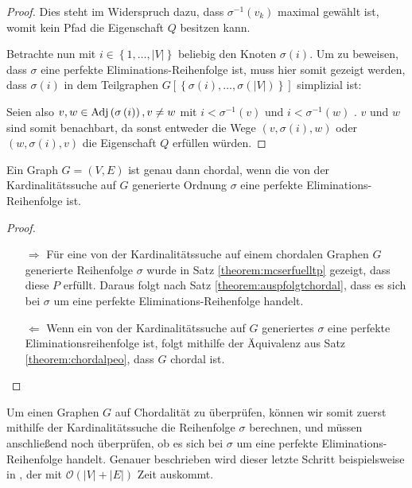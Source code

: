 \begin{proof}
	Dies steht im Widerspruch dazu, dass \( \sigma^{-1} \left( v_k \right) \) maximal gewählt ist, womit kein Pfad die Eigenschaft \( Q \) besitzen kann.

	Betrachte nun mit \( i \in \left\lbrace 1, \dots, \left| V \right| \right\rbrace \) beliebig den Knoten \( \sigma \left( i \right) \). Um zu beweisen, dass \( \sigma \) eine perfekte Eliminations-Reihenfolge ist, muss hier somit gezeigt werden, dass \( \sigma \left( i \right) \) in dem Teilgraphen \( G \left[ \left\lbrace \sigma \left( i \right), \ldots, \sigma \left( \left| V \right| \right) \right\rbrace \right] \) simplizial ist:

	Seien also \( v, w \in \textnormal{Adj} \left( \sigma \left( i \right) \right), v \neq w \) mit \( i < \sigma^{-1} \left( v \right) \) und \( i < \sigma^{-1} \left( w \right) \) . \( v \) und \( w \) sind somit benachbart, da sonst entweder die Wege \( \left( v, \sigma \left( i \right), w \right) \) oder \( \left( w, \sigma \left( i \right), v \right) \) die Eigenschaft \( Q \) erfüllen würden.
\end{proof}

\begin{corollary}
	Ein Graph \( G = \left( V, E \right) \) ist genau dann chordal, wenn die von der Kardinalitätssuche auf \( G \) generierte Ordnung \( \sigma \) eine perfekte Eliminations-Reihenfolge ist.
\end{corollary}

\begin{proof}
	\begin{itemize}
		\item[\( \Rightarrow \)]
		      Für eine von der Kardinalitätssuche auf einem chordalen Graphen \( G \) generierte Reihenfolge \( \sigma \) wurde in Satz \ref{theorem:mcserfuelltp} gezeigt, dass diese \( P \) erfüllt. Daraus folgt nach Satz \ref{theorem:auspfolgtchordal}, dass es sich bei \( \sigma \) um eine perfekte Eliminations-Reihenfolge handelt.
		\item[\( \Leftarrow \)]
		      Wenn ein von der Kardinalitätssuche auf \( G \) generiertes \( \sigma \) eine perfekte Eliminationsreihenfolge ist, folgt mithilfe der Äquivalenz aus Satz \ref{theorem:chordalpeo}, dass \( G \) chordal ist.
	\end{itemize}
\end{proof}

Um einen Graphen \( G \) auf Chordalität zu überprüfen, können wir somit zuerst mithilfe der Kardinalitätssuche die Reihenfolge \( \sigma \) berechnen, und müssen anschließend noch überprüfen, ob es sich bei \( \sigma \) um eine perfekte Eliminations-Reihenfolge handelt. Genauer beschrieben wird dieser letzte Schritt beispielsweise in \cite[Algorithmus 4.2]{golumbic}, der mit \( \mathcal{O} \left( \left| V \right| + \left| E \right| \right) \) Zeit auskommt.
